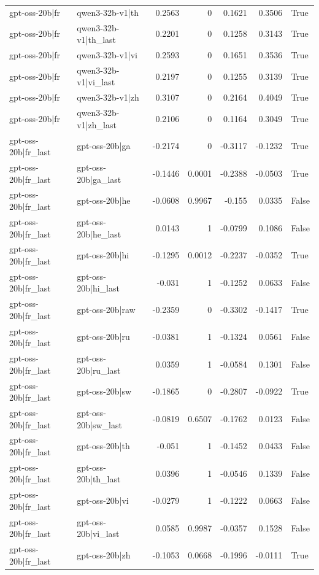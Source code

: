 \begin{table}
\begin{tabular}{l l r r r r l}
gpt-oss-20b|fr & qwen3-32b-v1|th & 0.2563 & 0 & 0.1621 & 0.3506 & True \\
gpt-oss-20b|fr & qwen3-32b-v1|th_last & 0.2201 & 0 & 0.1258 & 0.3143 & True \\
gpt-oss-20b|fr & qwen3-32b-v1|vi & 0.2593 & 0 & 0.1651 & 0.3536 & True \\
gpt-oss-20b|fr & qwen3-32b-v1|vi_last & 0.2197 & 0 & 0.1255 & 0.3139 & True \\
gpt-oss-20b|fr & qwen3-32b-v1|zh & 0.3107 & 0 & 0.2164 & 0.4049 & True \\
gpt-oss-20b|fr & qwen3-32b-v1|zh_last & 0.2106 & 0 & 0.1164 & 0.3049 & True \\
gpt-oss-20b|fr_last & gpt-oss-20b|ga & -0.2174 & 0 & -0.3117 & -0.1232 & True \\
gpt-oss-20b|fr_last & gpt-oss-20b|ga_last & -0.1446 & 0.0001 & -0.2388 & -0.0503 & True \\
gpt-oss-20b|fr_last & gpt-oss-20b|he & -0.0608 & 0.9967 & -0.155 & 0.0335 & False \\
gpt-oss-20b|fr_last & gpt-oss-20b|he_last & 0.0143 & 1 & -0.0799 & 0.1086 & False \\
gpt-oss-20b|fr_last & gpt-oss-20b|hi & -0.1295 & 0.0012 & -0.2237 & -0.0352 & True \\
gpt-oss-20b|fr_last & gpt-oss-20b|hi_last & -0.031 & 1 & -0.1252 & 0.0633 & False \\
gpt-oss-20b|fr_last & gpt-oss-20b|raw & -0.2359 & 0 & -0.3302 & -0.1417 & True \\
gpt-oss-20b|fr_last & gpt-oss-20b|ru & -0.0381 & 1 & -0.1324 & 0.0561 & False \\
gpt-oss-20b|fr_last & gpt-oss-20b|ru_last & 0.0359 & 1 & -0.0584 & 0.1301 & False \\
gpt-oss-20b|fr_last & gpt-oss-20b|sw & -0.1865 & 0 & -0.2807 & -0.0922 & True \\
gpt-oss-20b|fr_last & gpt-oss-20b|sw_last & -0.0819 & 0.6507 & -0.1762 & 0.0123 & False \\
gpt-oss-20b|fr_last & gpt-oss-20b|th & -0.051 & 1 & -0.1452 & 0.0433 & False \\
gpt-oss-20b|fr_last & gpt-oss-20b|th_last & 0.0396 & 1 & -0.0546 & 0.1339 & False \\
gpt-oss-20b|fr_last & gpt-oss-20b|vi & -0.0279 & 1 & -0.1222 & 0.0663 & False \\
gpt-oss-20b|fr_last & gpt-oss-20b|vi_last & 0.0585 & 0.9987 & -0.0357 & 0.1528 & False \\
gpt-oss-20b|fr_last & gpt-oss-20b|zh & -0.1053 & 0.0668 & -0.1996 & -0.0111 & True \\

\end{tabular}
\end{table}

